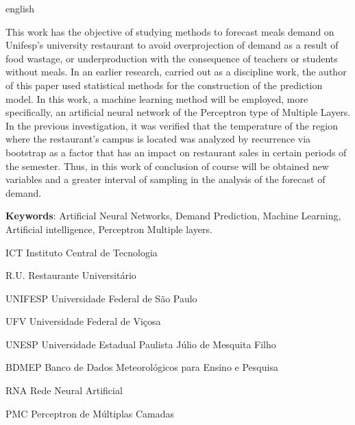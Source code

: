 \documentclass[	12pt, Times, openright, twoside, a4paper, english, brazil]{abntex2}
\begin{document}
    \begin{resumo}[Abstract]
     \begin{otherlanguage*}{english}


        This work has the objective of studying methods to forecast meals demand on Unifesp's university restaurant to avoid overprojection of demand as a result of food wastage, or underproduction with the consequence of teachers or students without meals.
        In an earlier research, carried out as a discipline work, the author of this paper used statistical methods for the construction of the prediction model. In this work, a machine learning method will be employed, more specifically, an artificial neural network of the Perceptron type of Multiple Layers. In the previous investigation, it was verified that the temperature of the region where the restaurant's campus is located was analyzed by recurrence via bootstrap as a factor that has an impact on restaurant sales in certain periods of the semester. Thus, in this work of conclusion of course will be obtained new variables and a greater interval of sampling in the analysis of the forecast of demand.

       \vspace{\onelineskip}
     
       \noindent 
       \textbf{Keywords}: Artificial Neural Networks, Demand Prediction, Machine Learning, Artificial intelligence, Perceptron Multiple layers.
     \end{otherlanguage*}
    \end{resumo}

    \listoffigures*
    \cleardoublepage

    \listoftables*
    \cleardoublepage

    \begin{siglas}
    \item[ICT] Instituto Central de Tecnologia
    \item[R.U.] Restaurante Universitário
    \item[UNIFESP] Universidade Federal de São Paulo
    \item[UFV] Universidade Federal de Viçosa
    \item[UNESP] Universidade Estadual Paulista Júlio de Mesquita Filho
    \item[BDMEP] Banco de Dados Meteorológicos para Ensino e Pesquisa
    \item[RNA] Rede Neural Artificial
    \item[PMC] Perceptron de Múltiplas Camadas

    \end{siglas}
\end{document}
